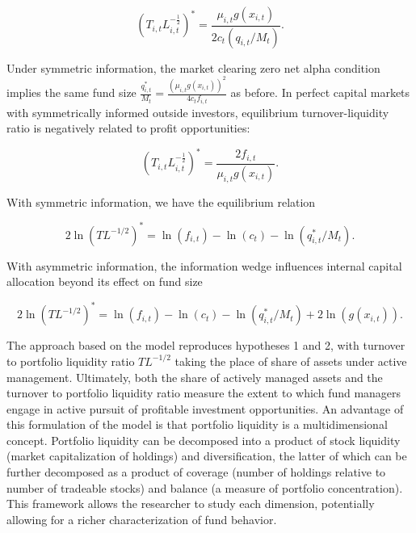 \documentclass[openany]{book}
\theoremstyle{definition}
\theoremstyle{definition}
\theoremstyle{definition}
\theoremstyle{remark}
\begin{document}
\begin{equation}
(T_{i,t}L_{i,t}^{-\frac{1}{2}})^\ast = \frac{\mu_{i,t}g(x_{i,t})}{2c_t(q_{i,t}/M_t)}.
\label{eq:PSTfoc}
\end{equation}

Under symmetric information, the market clearing zero net alpha
condition implies the same fund size
\(\frac{q_{i,t}^\ast}{M_t}=\frac{(\mu_{i,t}g(x_{i,t}))^2}{4c_t f_{i,t}}\)
as before. In perfect capital markets with symmetrically informed
outside investors, equilibrium turnover-liquidity ratio is negatively
related to profit opportunities:

\begin{equation}
(T_{i,t}L_{i,t}^{-\frac{1}{2}})^\ast=\frac{2f_{i,t}}{\mu_{i,t}g(x_{i,t})}.
\label{eq:PSTcapMkt}
\end{equation}

With symmetric information, we have the equilibrium relation

\begin{equation}
2\ln(TL^{-1/2})^\ast=\ln(f_{i,t}) - \ln(c_t) - \ln(q^\ast_{i,t}/M_t).
\label{eq:csEqTL}
\end{equation}

With asymmetric information, the information wedge influences internal
capital allocation beyond its effect on fund size

\begin{equation}
2\ln(TL^{-1/2})^\ast=\ln(f_{i,t}) - \ln(c_t) - \ln(q^\ast_{i,t}/M_t)+2\ln(g(x_{i,t})).
\label{eq:csEqaTL}
\end{equation}

The approach based on the \citet*{pst17L} model reproduces hypotheses 1
and 2, with turnover to portfolio liquidity ratio \(TL^{-1/2}\) taking
the place of share of assets under active management. Ultimately, both
the share of actively managed assets and the turnover to portfolio
liquidity ratio measure the extent to which fund managers engage in
active pursuit of profitable investment opportunities. An advantage of
this formulation of the model is that portfolio liquidity is a
multidimensional concept. Portfolio liquidity can be decomposed into a
product of stock liquidity (market capitalization of holdings) and
diversification, the latter of which can be further decomposed as a
product of coverage (number of holdings relative to number of tradeable
stocks) and balance (a measure of portfolio concentration). This
framework allows the researcher to study each dimension, potentially
allowing for a richer characterization of fund behavior.
\end{document}
